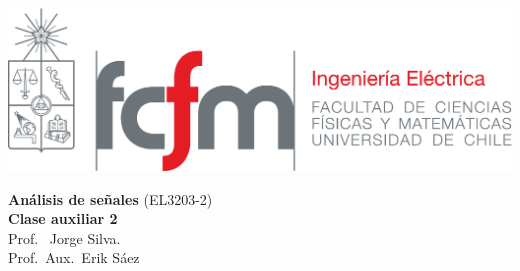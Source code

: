 \documentclass[
  11pt,
  letterpaper,
   addpoints,
  ]{exam}
\begin{document}
\noindent
\begin{minipage}{0.47\textwidth}
\includegraphics[width=\textwidth]{../fcfm_die}
\end{minipage}
\begin{minipage}{0.53\textwidth}
\begin{center} 
\large\textbf{Análisis de señales} (EL3203-2) \\
\large\textbf{Clase auxiliar 2} \\
\normalsize Prof.~ Jorge Silva.\\
\normalsize Prof.~Aux.~Erik Sáez
\end{center}
\end{minipage}

\vspace{0.5cm}
\noindent
\vspace{.85cm}
\end{document}
